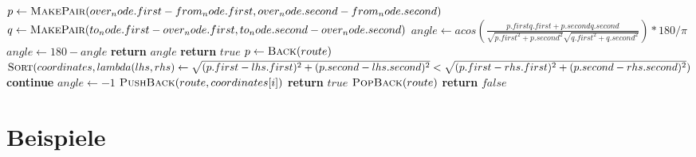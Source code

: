 \documentclass[a4paper,10pt,ngerman]{scrartcl}
\begin{document}
    \begin{algorithm}
        \begin{algorithmic}[1]
                \State $p \gets \Call{MakePair}{over_node.first-from_node.first,over_node.second-from_node.second}$
                \State $q \gets \Call{MakePair}{to_node.first-over_node.first,to_node.second-over_node.second}$
                \State $angle \gets acos(\frac{p.firstq.first+p.secondq.second}{\sqrt{p.first^2+p.second^2}\sqrt{q.first^2+q.second^2}})*180/\pi$
                    \State $angle \gets 180-angle$
                \EndIf
                \State \textbf{return} $angle$
            \EndFunction
            \State
                    \State \textbf{return} $true$
                \EndIf
                    \State $p \gets \Call{Back}{route}$
                    \State $\Call{Sort}{coordinates,lambda (lhs,rhs) \gets \sqrt{(p.first-lhs.first)^2+(p.second-lhs.second)^2}<\sqrt{(p.first-rhs.first)^2+(p.second-rhs.second)^2}}$
                \EndIf
                        \State \textbf{continue}
                    \EndIf
                    \State $angle \gets -1$
                    \EndIf
                        \State $\Call{PushBack}{route,coordinates[i]}$
                            \State \textbf{return} $true$
                        \Else
                            \State $\Call{PopBack}{route}$
                        \EndIf
                    \EndIf
                \EndFor
                \State \textbf{return} $false$
            \EndFunction
\end{algorithmic}\label{alg:algorithm}
    \end{algorithm}

    \newpage
    \section{Beispiele}\label{sec:beispiele}
    
\end{document}
